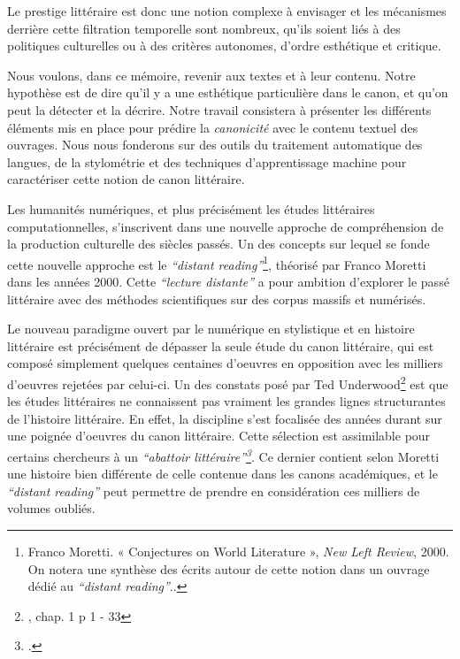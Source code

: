 Le prestige littéraire est donc une notion complexe à envisager et les mécanismes derrière cette filtration temporelle sont nombreux, qu'ils soient liés à des politiques culturelles ou à des critères autonomes, d'ordre esthétique et critique.

Nous voulons, dans ce mémoire, revenir aux textes et à leur contenu. Notre hypothèse est de dire qu'il y a une esthétique particulière dans le canon, et qu'on peut la détecter et la décrire. Notre travail consistera à présenter les différents éléments mis en place pour prédire la \textit{canonicité} avec le contenu textuel des ouvrages. Nous nous fonderons sur des outils du traitement automatique des langues, de la stylométrie et des techniques d'apprentissage machine pour caractériser cette notion de canon littéraire.

Les humanités numériques, et plus précisément les études littéraires computationnelles, s'inscrivent dans une nouvelle approche de compréhension de la production culturelle des siècles passés. Un des concepts sur lequel se fonde cette nouvelle approche est le \textit{\enquote{distant reading}}\footnote{Franco Moretti. « Conjectures on World Literature », \textit{New Left Review}, 2000. On notera une synthèse des écrits autour de cette notion dans un ouvrage dédié au \textit{\enquote{distant reading}}.\cite{moretti_distant_2013}.}, théorisé par Franco Moretti dans les années 2000. Cette \textit{\enquote{lecture distante}} a pour ambition d'explorer le passé littéraire avec des méthodes scientifiques sur des corpus massifs et numérisés. 

Le nouveau paradigme ouvert par le numérique en stylistique et en histoire littéraire est précisément de dépasser la seule étude du canon littéraire, qui est composé simplement quelques centaines d'oeuvres en opposition avec les milliers d'oeuvres rejetées par celui-ci. Un des constats posé par Ted Underwood\footnote{\cite{underwood_distant_2019}, chap. 1 p 1 - 33} est que les études littéraires ne connaissent pas vraiment les grandes lignes structurantes de l'histoire littéraire. En effet, la discipline s'est focalisée des années durant sur une poignée d'oeuvres du canon littéraire. Cette sélection est assimilable pour certains chercheurs à un \textit{\enquote{abattoir littéraire}\footcites{moretti_slaughterhouse_2000}}. Ce dernier contient selon Moretti une histoire bien différente de celle contenue dans les canons académiques, et le \textit{\enquote{distant reading}} peut permettre de prendre en considération ces milliers de volumes oubliés. 

